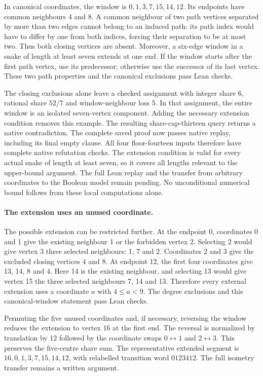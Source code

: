 \documentclass[11pt,a4paper]{article}
\theoremstyle{definition}
\theoremstyle{remark}
\begin{document}
In canonical coordinates, the window is $0,1,3,7,15,14,12$. Its endpoints
have common neighbours 4 and 8. A common neighbour of two path vertices
separated by more than two edges cannot belong to an induced path:
its path index would have to differ by one from both indices, forcing
their separation to be at most two. Thus both closing vertices are absent.
Moreover, a six-edge window in a snake of length at least seven extends
at one end. If the window starts after the first path vertex, use its
predecessor; otherwise use the successor of its last vertex. These
two path properties and the canonical exclusions pass Lean checks.

The closing exclusions alone leave a checked assignment with integer
share 6, rational share $52/7$ and window-neighbour loss 5. In that
assignment, the entire window is an isolated seven-vertex component.
Adding the necessary extension condition removes this example. The
resulting share-cap-thirteen query returns a native contradiction.
The complete saved proof now passes native replay, including its final
empty clause. All four floor-fourteen inputs therefore have complete
native refutation checks.
The extension condition is valid for every actual snake of length at
least seven, so it covers all lengths relevant to the upper-bound argument.
The full Lean replay and the transfer from arbitrary coordinates to the
Boolean model remain pending. No unconditional numerical bound follows
from these local computations alone.

\paragraph{The extension uses an unused coordinate.}
The possible extension can be restricted further. At the endpoint 0,
coordinates 0 and 1 give the existing neighbour 1 or the forbidden vertex 2.
Selecting 2 would give vertex 3 three selected neighbours: 1, 7 and 2.
Coordinates 2 and 3 give the excluded closing vertices 4 and 8.
At endpoint 12, the first four coordinates give 13, 14, 8 and 4.
Here 14 is the existing neighbour, and selecting 13 would give vertex 15
the three selected neighbours 7, 14 and 13. Therefore every external
extension uses a coordinate $a$ with $4\le a<9$.
The degree exclusions and this canonical-window statement pass Lean checks.

Permuting the five unused coordinates and, if necessary, reversing the
window reduces the extension to vertex 16 at the first end. The reversal
is normalized by translation by 12 followed by the coordinate swaps
$0\leftrightarrow1$ and $2\leftrightarrow3$. This preserves the five-centre
share sum. The representative extended segment is
$16,0,1,3,7,15,14,12$, with relabelled transition word $0123412$.
The full isometry transfer remains a written argument.
\end{document}
